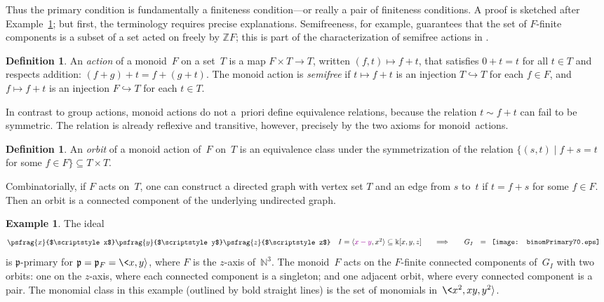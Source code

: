 \documentclass[12pt]{amsart}
\numberwithin{equation}{section}
\theoremstyle{definition}
\newtheorem{defn}[thm]{Definition}
\newtheorem{example}[thm]{Example}
\begin{document}
Thus the primary condition is fundamentally a finiteness
condition---or really a pair of finiteness conditions.  A proof is
sketched after Example~\ref{e:binomPrimary};
but first, the terminology requires precise explanations.
Semifreeness, for example,
guarantees that the set of $F$-finite components is a subset of a set
acted on freely by ${\mathbb{Z}} F$;
this is part of the characterization of semifree actions in
\cite{mesoprimary}.

\begin{defn}
An \emph{action} of a monoid~$F$ on a set~$T$ is a map $F \times T \to
T$, written $(f,t) \mapsto f + t$, that satisfies $0 + t = t$ for all
$t \in T$ and respects addition: $(f + g)+ t = f + (g + t)$.  The
monoid action is \emph{semifree} if $t \mapsto f + t$ is an injection
$T {\hookrightarrow} T$ for each $f \in F$, and $f \mapsto f + t$ is an injection
$F {\hookrightarrow} T$ for each $t \in T$.
\end{defn}

In contrast to group actions, monoid actions do not a~priori define
equivalence relations, because the relation $t \sim f + t$ can fail to
be symmetric.
The relation is already reflexive
and transitive, however, precisely by the two axioms for
monoid~actions.

\begin{defn}\label{d:orbit}
An \emph{orbit} of a monoid action of~$F$ on~$T$ is an equivalence
class under the symmetrization of the relation $\{(s,t) \mid f + s
= t$ for some $f \in F\} \subseteq T \times T$.
\end{defn}

Combinatorially, if $F$ acts on~$T$, one can construct a directed
graph
with vertex set $T$ and an edge from $s$ to~$t$ if $t = f + s$ for
some $f \in F$.
Then an orbit is a connected component of the underlying undirected
graph.

\begin{example}\label{e:binomPrimary}
The ideal
$$\psfrag{x}{$\scriptstyle x$}
\psfrag{y}{$\scriptstyle y$}
\psfrag{z}{$\scriptstyle z$}
\begin{array}{cc}
\\[-3ex]
  \begin{array}{c}
  I = {\langle}{\color{darkpurple}x-y},x^2{\rangle}
  \subseteq {\Bbbk}[x,y,z]
  \qquad{\Longrightarrow}\ \
  \end{array}
&
  G_I\ \ = \begin{array}{c}\texttt{[image: binomPrimary70.eps]}\end{array}
\end{array}
$$is ${\mathfrak{p}}$-primary for ${\mathfrak{p}} = {\mathfrak{p}}_F = \<x,y{\rangle}$, where $F$ is the
$z$-axis of~${\mathbb{N}}^3$.  The monoid~$F$ acts on the $F$-finite connected
components of~$G_I$ with two orbits: one on the $z$-axis, where each
connected component is a singleton; and one adjacent orbit, where
every connected component is a pair.  The monomial class in this
example (outlined by bold straight lines) is the set of monomials
in~$\<x^2,xy,y^2{\rangle}$.
\end{example}
\end{document}
